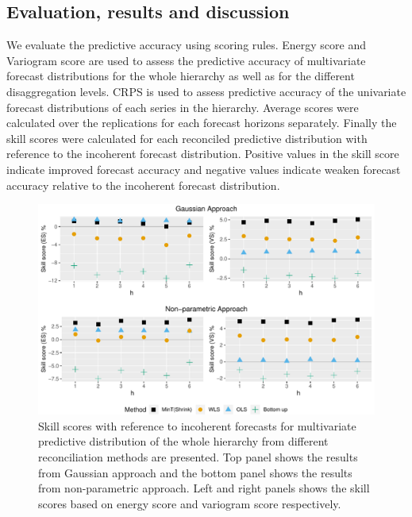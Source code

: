 \documentclass[12pt]{article}
\theoremstyle{definition}
\begin{document}
\subsection{Evaluation, results and discussion}

We evaluate the predictive accuracy using scoring rules. Energy score and Variogram score are used to assess the predictive accuracy of multivariate forecast distributions for the whole hierarchy as well as for the different disaggregation levels. CRPS is used to assess predictive accuracy of the univariate forecast distributions of each series in the hierarchy. Average scores were calculated over the replications for each forecast horizons separately. Finally the skill scores were calculated for each reconciled predictive distribution with reference to the incoherent forecast distribution. Positive values in the skill score indicate improved forecast accuracy and negative values indicate weaken forecast accuracy relative to the incoherent forecast distribution.

\begin{figure}
	\centering
	\small
	\includegraphics[width= .95\textwidth]{Empirical-results/AllTS_MultiVScores.pdf}
	\caption{Skill scores with reference to incoherent forecasts for multivariate predictive distribution of the whole hierarchy from different reconciliation methods are presented. Top panel shows the results from Gaussian approach and the bottom panel shows the results from non-parametric approach. Left and right panels shows the skill scores based on energy score and variogram score respectively.}\label{fig:EmpResults_AllTS}
\end{figure}
\end{document}
